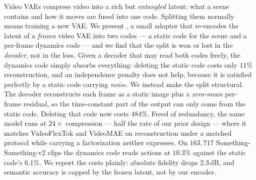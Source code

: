 Video VAEs compress video into a rich but \emph{entangled} latent: what a scene
contains and how it moves are fused into one code. Splitting them normally means
training a new VAE. We present \method{}, a small adapter that re-encodes the latent
of a \emph{frozen} video VAE into two codes --- a static code for the scene and a
per-frame dynamics code --- and we find that the split is won or lost in the
\emph{decoder}, not in the loss. Given a decoder that may read both codes freely, the
dynamics code simply absorbs everything: deleting the static code costs only $11\%$
reconstruction, and an independence penalty does not help, because it is satisfied
perfectly by a static code carrying \emph{noise}. We instead make the split
structural. The decoder reconstructs each frame as a static image plus a
\emph{zero-mean} per-frame residual, so the time-constant part of the output can only
come from the static code. Deleting that code now costs $484\%$. Freed of redundancy,
the same model runs at $24\times$ compression --- half the rate of our prior design ---
where it matches VideoFlexTok and VideoMAE on reconstruction under a matched protocol
while carrying a factorization neither expresses. On $163{,}717$ Something-Something-v2
clips the dynamics code reads actions at $10.3\%$ against the static code's $6.1\%$.
We report the costs plainly: absolute fidelity drops $2.3$\,dB, and semantic accuracy
is capped by the frozen latent, not by our encoder.
